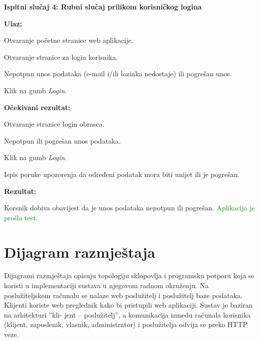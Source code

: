  			\textnormal{\textbf{Ispitni slučaj 4: Rubni slučaj prilikom korisničkog logina}\\}
 			
 			\textnormal{\textbf{Ulaz:}}
 			
 			\begin{packed_enum}
 				\item Otvaranje početne stranice web aplikacije.
 				\item Otvaranje stranice za login korisnika.
 				\item Nepotpun unos podataka (e-mail i/ili lozinka nedostaje) ili pogrešan unos.
 				\item Klik na gumb \textit{Login}.
 			\end{packed_enum}
 			
 			\textnormal{\textbf{Očekivani rezultat:}}
 			
 			\begin{packed_enum}
 				\item Otvaranje stranice login obrasca.
 				\item Nepotpun ili pogrešan unos podataka.
 				\item Klik na gumb \textit{Login}.
 				\item Ispis poruke upozorenja da određeni podatak mora biti unijet ili je pogrešan.
 			\end{packed_enum}
 			
 			\textnormal{\textbf{Rezultat:}}
 			
 			\textnormal{Korsnik dobiva obavijest da je unos podataka nepotpun ili pogrešan. \textcolor{green}{Aplikacija je prošla test.}}
			
			\eject 
		
		
		\section{Dijagram razmještaja}
			
		
			
			 \textnormal{Dijagrami razmještaja opisuju topologiju sklopovlja i programsku potporu koja se koristi u implementaciji sustava u njegovom radnom okruženju. Na poslužiteljskom računalu se nalaze web poslužitelj i poslužitelj baze podataka. Klijenti koriste web preglednik kako bi pristupili web aplikaciji. Sustav je baziran na arhitekturi ”kli- jent – poslužitelj”, a komunikacija izmedu računala korisnika (klijent, zaposlenik, vlasnik, administrator) i poslužitelja odvija se preko HTTP veze.}
			 
